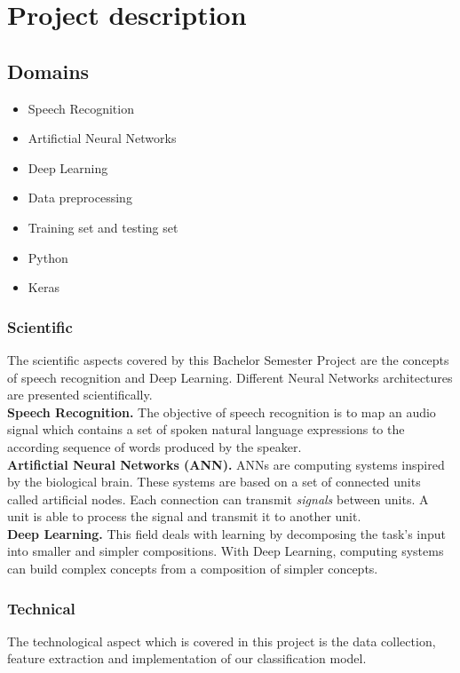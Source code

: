 \section{Project description}
\subsection{Domains}

\begin{itemize}
        \item Speech Recognition
        \item Artifictial Neural Networks
        \item Deep Learning 
        \item Data preprocessing
        \item Training set and testing set
        \item Python
        \item Keras
\end{itemize}

\subsubsection{Scientific}

The scientific aspects covered by this Bachelor Semester Project are the
concepts of speech recognition and Deep Learning. Different Neural Networks
architectures are presented scientifically. \\

\textbf{Speech Recognition.} The objective of speech recognition is to map an
audio signal which contains a set of spoken natural language expressions to the
according sequence of words produced by the speaker.\\

\textbf{Artifictial Neural Networks (ANN).} ANNs are computing systems inspired
by the biological brain. These systems are based on a set of connected units
called artificial nodes. Each connection can transmit \textit{signals} between
units. A unit is able to process the signal and transmit it to another unit.\\

\textbf{Deep Learning.} This field deals with learning by decomposing the task's
input into smaller and simpler compositions. With Deep Learning, computing
systems can build complex concepts from a composition of simpler concepts.

\subsubsection{Technical} The technological aspect which is covered in this
project is the data collection, feature extraction and implementation of our
classification model. \\


